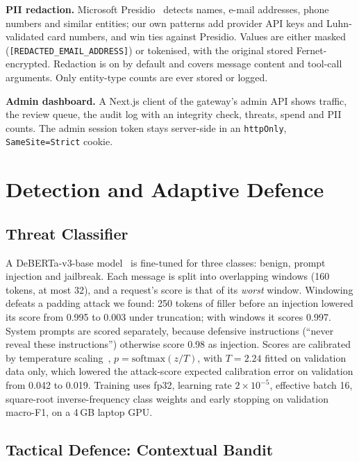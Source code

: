 \documentclass[conference]{IEEEtran}
\begin{document}
\textbf{PII redaction.} Microsoft Presidio~\cite{presidio} detects names,
e-mail addresses, phone numbers and similar entities; our own patterns add
provider API keys and Luhn-validated card numbers, and win ties against
Presidio. Values are either masked (\texttt{[REDACTED\_EMAIL\_ADDRESS]}) or
tokenised, with the original stored Fernet-encrypted. Redaction is on by
default and covers message content and tool-call arguments. Only
entity-type counts are ever stored or logged.

\textbf{Admin dashboard.} A Next.js client of the gateway's admin API shows
traffic, the review queue, the audit log with an integrity check, threats,
spend and PII counts. The admin session token stays server-side in an
\texttt{httpOnly}, \texttt{SameSite=Strict} cookie.

\section{Detection and Adaptive Defence}

\subsection{Threat Classifier}

A DeBERTa-v3-base model~\cite{he2023debertav3} is fine-tuned for three
classes: benign, prompt injection and jailbreak. Each message is split into
overlapping windows (160 tokens, at most 32), and a request's score is that
of its \emph{worst} window. Windowing defeats a padding attack we found:
250 tokens of filler before an injection lowered its score from 0.995 to
0.003 under truncation; with windows it scores 0.997. System prompts are
scored separately, because defensive instructions (``never reveal these
instructions'') otherwise score 0.98 as injection. Scores are calibrated by
temperature scaling~\cite{guo2017calibration}, $p=\mathrm{softmax}(z/T)$,
with $T=2.24$ fitted on validation data only, which lowered the
attack-score expected calibration error on validation from 0.042 to 0.019.
Training uses fp32, learning rate $2\times10^{-5}$, effective batch 16,
square-root inverse-frequency class weights and early stopping on
validation macro-F1, on a 4\,GB laptop GPU.

\subsection{Tactical Defence: Contextual Bandit}
\end{document}
